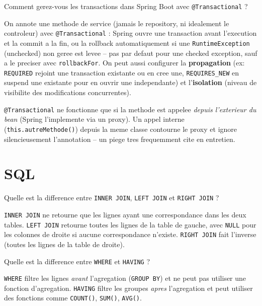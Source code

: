 \documentclass[11pt,a4paper]{article}
\begin{document}
\begin{question} Comment gerez-vous les transactions dans Spring Boot avec \texttt{@Transactional} ?
\end{question}
\begin{reponse}
On annote une methode de service (jamais le repository, ni idealement le controleur) avec \texttt{@Transactional} : Spring ouvre une transaction avant l'execution et la commit a la fin, ou la rollback automatiquement si une \texttt{RuntimeException} (unchecked) non geree est levee -- pas par defaut pour une checked exception, sauf a le preciser avec \texttt{rollbackFor}. On peut aussi configurer la \textbf{propagation} (ex: \texttt{REQUIRED} rejoint une transaction existante ou en cree une, \texttt{REQUIRES\_NEW} en suspend une existante pour en ouvrir une independante) et l'\textbf{isolation} (niveau de visibilite des modifications concurrentes).
\end{reponse}

\begin{piege}
\texttt{@Transactional} ne fonctionne que si la methode est appelee \emph{depuis l'exterieur du bean} (Spring l'implemente via un proxy). Un appel interne (\texttt{this.autreMethode()}) depuis la meme classe contourne le proxy et ignore silencieusement l'annotation -- un piege tres frequemment cite en entretien.
\end{piege}

\newpage
\section{SQL}

\begin{question} Quelle est la difference entre \texttt{INNER JOIN}, \texttt{LEFT JOIN} et \texttt{RIGHT JOIN} ?
\end{question}
\begin{reponse}
\texttt{INNER JOIN} ne retourne que les lignes ayant une correspondance dans les deux tables. \texttt{LEFT JOIN} retourne toutes les lignes de la table de gauche, avec \texttt{NULL} pour les colonnes de droite si aucune correspondance n'existe. \texttt{RIGHT JOIN} fait l'inverse (toutes les lignes de la table de droite).
\end{reponse}

\begin{question} Quelle est la difference entre \texttt{WHERE} et \texttt{HAVING} ?
\end{question}
\begin{reponse}
\texttt{WHERE} filtre les lignes \emph{avant} l'agregation (\texttt{GROUP BY}) et ne peut pas utiliser une fonction d'agregation. \texttt{HAVING} filtre les groupes \emph{apres} l'agregation et peut utiliser des fonctions comme \texttt{COUNT()}, \texttt{SUM()}, \texttt{AVG()}.
\end{reponse}
\end{document}
